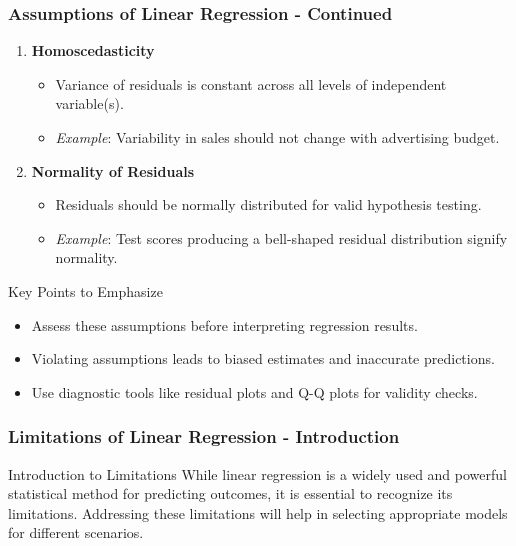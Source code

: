\documentclass[aspectratio=169]{beamer}
\begin{document}
\begin{frame}[fragile]
    \frametitle{Assumptions of Linear Regression - Continued}
    \begin{enumerate}[resume]
        \item \textbf{Homoscedasticity}
            \begin{itemize}
                \item Variance of residuals is constant across all levels of independent variable(s).
                \item \textit{Example}: Variability in sales should not change with advertising budget.
            \end{itemize}

        \item \textbf{Normality of Residuals}
            \begin{itemize}
                \item Residuals should be normally distributed for valid hypothesis testing.
                \item \textit{Example}: Test scores producing a bell-shaped residual distribution signify normality.
            \end{itemize}
    \end{enumerate}
    
    \begin{block}{Key Points to Emphasize}
        \begin{itemize}
            \item Assess these assumptions before interpreting regression results.
            \item Violating assumptions leads to biased estimates and inaccurate predictions.
            \item Use diagnostic tools like residual plots and Q-Q plots for validity checks.
        \end{itemize}
    \end{block}
\end{frame}

\begin{frame}[fragile]
    \frametitle{Limitations of Linear Regression - Introduction}
    \begin{block}{Introduction to Limitations}
        While linear regression is a widely used and powerful statistical method for predicting outcomes, it is essential to recognize its limitations. Addressing these limitations will help in selecting appropriate models for different scenarios.
    \end{block}
\end{frame}
\end{document}
